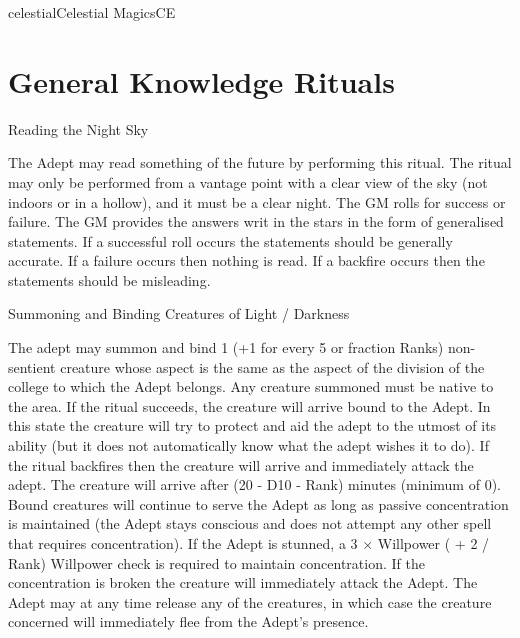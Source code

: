 \begin{College}[1.3]{celestial}{Celestial Magics}{CE}
\section{General Knowledge Rituals}

\begin{ritual}[Q-1]{Reading the Night Sky }

\begin{effects}
The Adept may read something of the future by performing this ritual.
The ritual may only be performed from a vantage point with a clear
view of the sky (not indoors or in a hollow), and it must be a clear
night.  The GM rolls for success or failure.  The GM provides the
answers writ in the stars in the form of generalised statements.  If a
successful roll occurs the statements should be generally accurate.
If a failure occurs then nothing is read.  If a backfire occurs then
the statements should be misleading.
\end{effects}
\end{ritual}


\begin{ritual}[Q-2]{Summoning and Binding Creatures of Light / Darkness}

\begin{effects}
The adept may summon and bind 1 (+1 for every 5 or fraction Ranks)
non-sentient creature whose aspect is the same as the aspect of the
division of the college to which the Adept belongs.  Any creature
summoned must be native to the area.  If the ritual succeeds, the
creature will arrive bound to the Adept.  In this state the creature
will try to protect and aid the adept to the utmost of its ability
(but it does not automatically know what the adept wishes it to do).
If the ritual backfires then the creature will arrive and immediately
attack the adept.  The creature will arrive after (20 - D10 - Rank)
minutes (minimum of 0).  Bound creatures will continue to serve the
Adept as long as passive concentration is maintained (the Adept stays
conscious and does not attempt any other spell that requires
concentration).  If the Adept is stunned, a 3 × Willpower ( + 2 /
Rank) Willpower check is required to maintain concentration.  If the
concentration is broken the creature will immediately attack the
Adept.  The Adept may at any time release any of the creatures, in
which case the creature concerned will immediately flee from the
Adept’s presence.


\end{effects}
\end{ritual}
\end{College}
